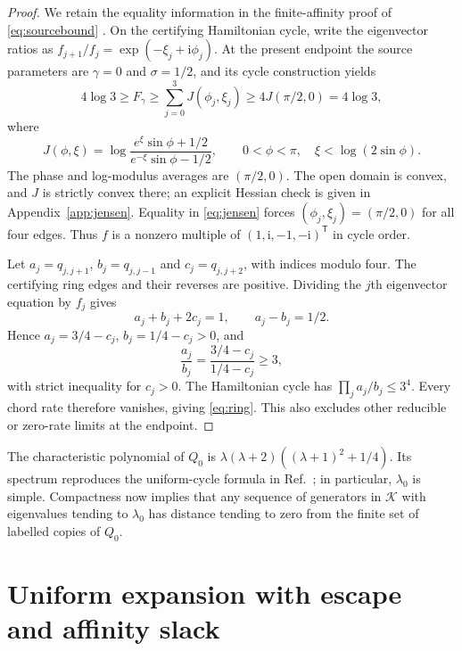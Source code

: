 \documentclass[11pt,a4paper]{article}
\newcommand{\K}{\mathcal K}
\newcommand{\ii}{\mathrm i}
\newcommand{\trans}{^{\mathsf T}}
\begin{document}
\begin{proof}
We retain the equality information in the finite-affinity proof of
\eqref{eq:sourcebound} \cite[SM3, Eq.~(S55), and SM5]{Kolchinsky2026}.
On the certifying Hamiltonian cycle, write the eigenvector ratios as
$f_{j+1}/f_j=\exp(-\xi_j+\ii\phi_j)$. At the present endpoint the
source parameters are $\gamma=0$ and $\sigma=1/2$, and its cycle
construction yields
\begin{equation}\label{eq:jensen}
 4\log3\geq F_\gamma\geq\sum_{j=0}^3 J(\phi_j,\xi_j)
 \geq 4J(\pi/2,0)=4\log3,
\end{equation}
where
\begin{equation}\label{eq:J}
 J(\phi,\xi)=\log\frac{e^\xi\sin\phi+1/2}
                              {e^{-\xi}\sin\phi-1/2},
 \qquad 0<\phi<\pi,\quad \xi<\log(2\sin\phi).
\end{equation}
The phase and log-modulus averages are $(\pi/2,0)$.
The open domain is convex, and $J$ is strictly convex there; an explicit
Hessian check is given in Appendix~\ref{app:jensen}.
Equality in \eqref{eq:jensen} forces $(\phi_j,\xi_j)=(\pi/2,0)$
for all four edges. Thus $f$ is a nonzero multiple of
$(1,\ii,-1,-\ii)\trans$ in cycle order.

Let $a_j=q_{j,j+1}$, $b_j=q_{j,j-1}$ and $c_j=q_{j,j+2}$, with
indices modulo four. The certifying ring edges and their reverses are
positive. Dividing the $j$th eigenvector equation by $f_j$ gives
\begin{equation}\label{eq:endpointeigen}
 a_j+b_j+2c_j=1,\qquad a_j-b_j=1/2.
\end{equation}
Hence $a_j=3/4-c_j$, $b_j=1/4-c_j>0$, and
\begin{equation}
 \frac{a_j}{b_j}=\frac{3/4-c_j}{1/4-c_j}\geq3,
\end{equation}
with strict inequality for $c_j>0$. The Hamiltonian cycle has
$\prod_j a_j/b_j\leq3^4$. Every chord rate therefore vanishes, giving
\eqref{eq:ring}. This also excludes other reducible or zero-rate
limits at the endpoint.
\end{proof}

The characteristic polynomial of $Q_0$ is
$\lambda(\lambda+2)((\lambda+1)^2+1/4)$. Its spectrum reproduces the
uniform-cycle formula in Ref.~\cite[Eq.~(S66)]{Kolchinsky2026}; in
particular, $\lambda_0$ is simple. Compactness now implies that any
sequence of generators in $\K$ with eigenvalues tending to $\lambda_0$
has distance tending to zero from the finite set of labelled copies of
$Q_0$.

\section{Uniform expansion with escape and affinity slack}\label{sec:expansion}
\end{document}
